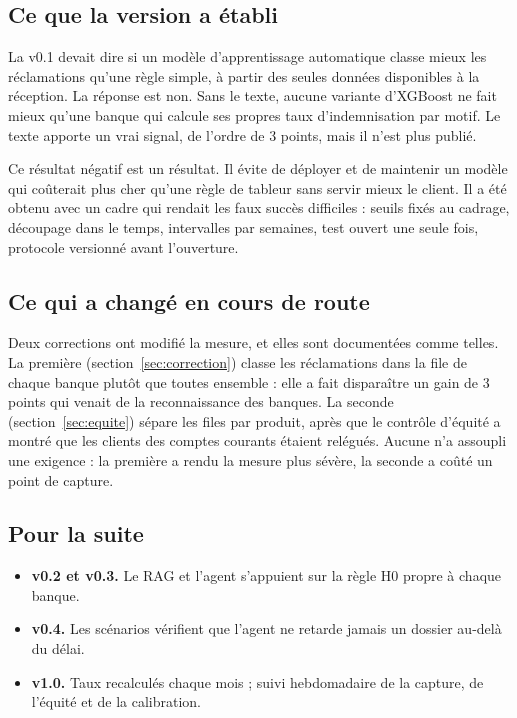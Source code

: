 \documentclass[11pt,a4paper]{article}
\begin{document}
\subsection{Ce que la version a établi}

La v0.1 devait dire si un modèle d'apprentissage automatique classe mieux les réclamations qu'une règle simple, à partir des seules données disponibles à la réception. La réponse est non. Sans le texte, aucune variante d'XGBoost ne fait mieux qu'une banque qui calcule ses propres taux d'indemnisation par motif. Le texte apporte un vrai signal, de l'ordre de 3 points, mais il n'est plus publié.

Ce résultat négatif est un résultat. Il évite de déployer et de maintenir un modèle qui coûterait plus cher qu'une règle de tableur sans servir mieux le client. Il a été obtenu avec un cadre qui rendait les faux succès difficiles : seuils fixés au cadrage, découpage dans le temps, intervalles par semaines, test ouvert une seule fois, protocole versionné avant l'ouverture.

\subsection{Ce qui a changé en cours de route}

Deux corrections ont modifié la mesure, et elles sont documentées comme telles. La première (section~\ref{sec:correction}) classe les réclamations dans la file de chaque banque plutôt que toutes ensemble : elle a fait disparaître un gain de 3 points qui venait de la reconnaissance des banques. La seconde (section~\ref{sec:equite}) sépare les files par produit, après que le contrôle d'équité a montré que les clients des comptes courants étaient relégués. Aucune n'a assoupli une exigence : la première a rendu la mesure plus sévère, la seconde a coûté un point de capture.

\subsection{Pour la suite}

\begin{itemize}
  \item \textbf{v0.2 et v0.3.} Le RAG et l'agent s'appuient sur la règle H0 propre à chaque banque.
  \item \textbf{v0.4.} Les scénarios vérifient que l'agent ne retarde jamais un dossier au-delà du délai.
  \item \textbf{v1.0.} Taux recalculés chaque mois ; suivi hebdomadaire de la capture, de l'équité et de la calibration.
\end{itemize}
\end{document}
